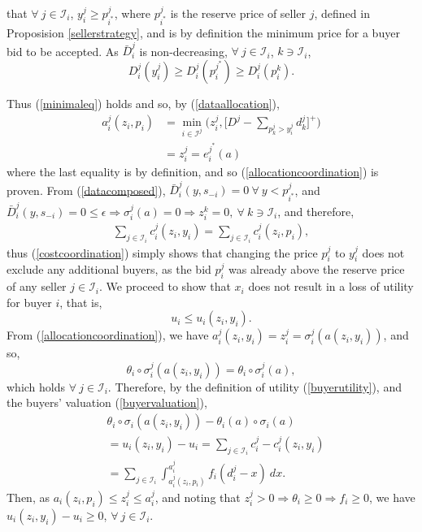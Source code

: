 \documentclass[12pt]{article}
\theoremstyle{definition}
\newcommand{\mcI}{\mathcal{I}}
\newcommand{\g}{\sigma}
\begin{document}
\begin{multicols}{2}
that $\forall \ j\in\mcI_i$, $y_i^j \ge p_{i^*}^j$, where $p_{i^*}^j$ is the reserve price of seller $j$, defined in Proposision
\ref{sellerstrategy}, and is by definition the minimum price for a buyer bid to
be accepted. 
As $\bar{D}_i^j$ is non-decreasing, $\forall \ j\in \mcI_i$,
$k\ni\mcI_i$,
$$
    D_i^j(y_i^j) \ge D_i^j(p_i^{j^*})\ge D_i^j(p_i^{k}).
$$
\iffalse
Furthermore, suppose there exists buyer $k\in \mcI^j$, such that
$\g_k^{j^*}(a) \ge \g_i^{j^*}(a)$ and $D^j - \sum_{k\in\mcI^j,k\ne i}d_k^j < z_i^{j}$, resulting in a
partial allocation. Bid $s_k^j \in s_{-i}$, and so is considered in buyer $i$'s strategy. 
As buyer $i$ is allowed to choose subset $\mcI_i$, and $\mcI_i$ is a minimal
set, (\ref{buyercoordinate}) states that $n$ is such that $\g_i^{j*}(a)
\ge \g_k^{j^*}(a)$ for any $k\in\mcI$, therefore such a buyer $k$ cannot exist.
We have, $\forall \ j\in \mcI_i$, $k\ni\mcI_i$,
$$
    {\theta_i}'(e_i^{k}(a)) \ge {\theta_i}'(e_i^{j^*}(a)) \ge y_i^j.
$$
Now, suppose that $p_k^j = p_i^j$, however $d_k^j > d_i^j$...
\fi
Thus (\ref{minimaleq}) holds and so, by (\ref{dataallocation}),
\begin{align*}
     a_i^j(z_i,p_i) &=\min_{i\in\mcI^j}\bigg(z_i^j, \bigg\lbrack D^{j} - \sum_{p_k^{j}> y_i^{j}}
d_k^{j}\bigg\rbrack^+\bigg) \\
    &= z_i^{j}= e_i^{j^*}(a)
\end{align*}
where the last equality is by definition, and so (\ref{allocationcoordination}) is proven.
From (\ref{datacomposed}), $\bar{D}_i^j(y, s_{-i}) =
0 \ \forall \ y < p_{i^*}^j$, and $\bar{D}_i^j(y, s_{-i}) =0 \le \epsilon
\Rightarrow \g_i^j(a) = 0 \Rightarrow z_i^k = 0, \ \forall \ k \ni \mcI_i$, and therefore,
\begin{align*}
    \displaystyle\sum_{j\in\mcI_i} c_i^j(z_i,y_i) =\sum_{j\in\mcI_i}
c_i^j(z_i,p_i),
\end{align*}
thus (\ref{costcoordination}) simply shows that changing the price $p^j_i$ to $y^j_i$ does not exclude any
additional buyers, as the bid $p^j_i$ was already above the reserve price of any
seller $j \in \mcI_i$.
We proceed to show that $x_i$ does not result in a loss of utility for
buyer $i$, that is,
$$
    u_i \le u_i(z_i,y_i).
$$
From (\ref{allocationcoordination}), we have $a_i^{j}(z_i,y_i) = z_i^{j} = \g_i^j(a(z_i,y_i))$, 
and so,
$$
    \theta_i\circ \g_i^j(a(z_i,y_i)) = \theta_i\circ \g_i^j(a),
$$ 
which holds $\forall \ j\in\mcI_i$.
Therefore, by the definition of utility (\ref{buyerutility}),
and the buyers' valuation (\ref{buyervaluation}), 
\begin{align*}
    &\theta_i\circ \g_i(a(z_i,y_i)) - \theta_i(a)\circ \g_i(a) \\
    &= u_i(z_i,y_i) - u_i =  \displaystyle\sum_{j\in\mcI_i} c_i^j -c_i^{j}(z_i,y_i)\\
    &= \sum_{j\in\mcI_i}\int_{a_i^j(z_i,p_i)}^{a_i^j} f_i(d_i^j - x) \ dx.
\end{align*}
Then, as $a_i(z_i,p_i) \le z_i^j \le a_i^j $, and noting that
$z_i^j>0\Rightarrow \theta_i\ge 0\Rightarrow f_i\ge 0$, we have $u_i(z_i,y_i) - u_i \ge 0$, $\forall \ j\in\mcI_i$.


\end{multicols}
\end{document}
